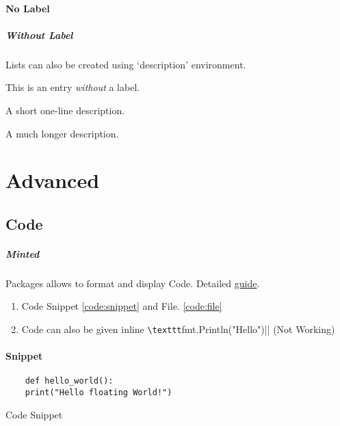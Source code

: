 \documentclass{report}[a4paper,12pt] %
\begin{document}
\vspace{10pt}

\subsubsection{No Label}
\paragraph{Without Label} Lists can also be created using `description' environment.

\begin{description}
  \item This is an entry \textit{without} a label.
  \item[Something short] A short one-line description.
  \item[Something long] A much longer description. \lipsum[1]
\end{description}

\chapter{Advanced}
\section{Code}
\paragraph{Minted} Packages allows to format and display Code. Detailed \href{https://mirror.niser.ac.in/ctan/macros/latex/contrib/minted/minted.pdf}{guide}.

\begin{enumerate}
  \item Code Snippet \ref{code:snippet} and File. \ref{code:file}
  \item Code can also be given inline \verb|\texttt|fmt.Println("Hello")|| (Not Working)
\end{enumerate}

\subsubsection{Snippet}
\begin{listing}[h]
  \begin{verbatim}
    def hello_world():
    print("Hello floating World!")
  \end{verbatim}
  \caption{Code Snippet}
  \label{code:snippet}
\end{listing}
\end{document}
